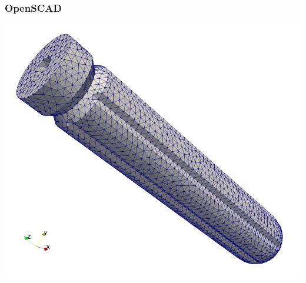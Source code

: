 \documentclass{beamer}
\begin{document}
\begin{frame}
\frametitle{OpenSCAD} 
\centerline{\includegraphics[scale = 0.3]{./figs/sdh_mesh}} 
\end{frame}
\end{document}
